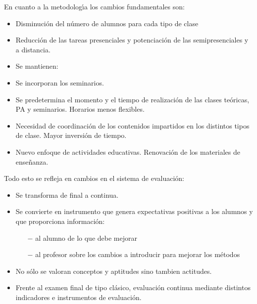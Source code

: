 \begin{enumerate}[a)]
En cuanto a la metodolog\'{\i}a los cambios fundamentales son:
\begin{itemize}
\item Disminuci\'{o}n  del n\'{u}mero de alumnos para cada tipo de 
clase
\item Reducci\'{o}n de las tareas presenciales y potenciaci\'{o}n de las 
semipresenciales y a distancia.
\item
\begin{minipage} {0.18\linewidth}
{Se mantienen:}
\end{minipage}

\item Se incorporan los seminarios.
\item Se predetermina el momento y el tiempo de realizaci\'{o}n de las
clases te\'{o}ricas, PA y seminarios. Horarios menos flexibles.
\item Necesidad de coordinaci\'{o}n de los contenidos impartidos en 
 los distintos tipos de clase. Mayor inversi\'{o}n de tiempo.
\item Nuevo enfoque de actividades educativas. Renovaci\'{o}n de los
materiales de ense\~{n}anza.
\end{itemize}

Todo esto se refleja en cambios en el sistema de evaluaci\'{o}n:
 \begin{itemize}
\item Se transforma de final a continua.
\item Se convierte en instrumento que genera expectativas positivas
a los alumnos y que proporciona informaci\'{o}n:
        \begin{itemize}
	 \setlength{\itemsep}{0cm}%
        \setlength{\parskip}{0cm}%
        \item [$-$] al alumno de lo que debe mejorar
        \item [$-$] al profesor sobre los cambios a introducir para mejorar los m\'{e}todos
        \end{itemize}
\item No s\'{o}lo se valoran conceptos y aptitudes sino tambien actitudes.
\item Frente al examen final de tipo cl\'{a}sico, evaluaci\'{o}n continua mediante 
distintos indicadores e instrumentos de evaluaci\'{o}n.

\end{itemize}

\end{enumerate}

